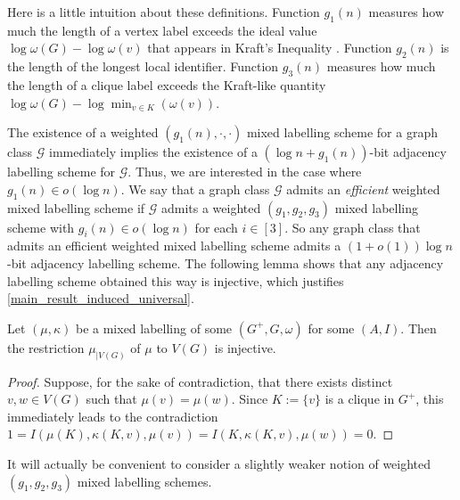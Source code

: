 \documentclass[twoside,leqno]{article}
\newcommand{\defin}[1]{\emph{\textcolor{brightmaroon}{#1}}}
\begin{document}
Here is a little intuition about these definitions. Function $g_1(n)$ measures how much the length of a vertex label exceeds the ideal value $\log \omega(G) - \log\omega(v)$ that appears in Kraft's Inequality \cite{Kraft1949}. Function $g_2(n)$ is the length of the longest local identifier. Function $g_3(n)$ measures how much the length of a clique label exceeds the Kraft-like quantity $\log\omega(G)-\log\min_{v\in K}(\omega(v))$.


The existence of a weighted $(g_1(n),\cdot,\cdot)$ mixed labelling scheme for a graph class $\mathcal{G}$ immediately implies the existence of a $(\log n+g_1(n))$-bit adjacency labelling scheme for $\mathcal{G}$. Thus, we are interested in the case where $g_1(n)\in o(\log n)$. We say that a graph class $\mathcal{G}$ admits an \defin{efficient} weighted mixed labelling scheme if $\mathcal{G}$ admits a weighted $(g_1,g_2,g_3)$ mixed labelling scheme with $g_i(n)\in o(\log n)$ for each $i\in [3]$. So any graph class that admits an efficient weighted mixed labelling scheme admits a $(1+o(1))\log n$-bit adjacency labelling scheme. The following lemma shows that any adjacency labelling scheme obtained this way is injective, which justifies \cref{main_result_induced_universal}.

\begin{lem}
  Let $(\mu,\kappa)$ be a mixed labelling of some $(G^+,G,\omega)$ for some $(A,I)$. Then the restriction $\mu_{|V(G)}$ of $\mu$ to $V(G)$ is injective.
\end{lem}

\begin{proof}
  Suppose, for the sake of contradiction, that there exists distinct $v,w\in V(G)$ such that $\mu(v)=\mu(w)$. Since  $K:=\{v\}$ is a clique in $G^+$, this immediately leads to the contradiction
  $1=I(\mu(K),\kappa(K,v),\mu(v))=I(K,\kappa(K,v),\mu(w))=0$.
\end{proof}



It will actually be convenient to consider a slightly weaker notion of weighted $(g_1,g_2,g_3)$ mixed labelling schemes.
\end{document}
